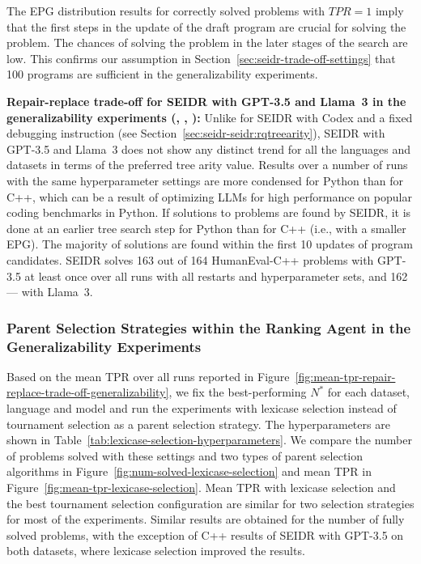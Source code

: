 The EPG distribution results for correctly solved problems with $TPR=1$ imply that the first steps in the update of the draft program are crucial for solving the problem. 
The chances of solving the problem in the later stages of the search are low.
This confirms our assumption in Section~\ref{sec:seidr-trade-off-settings} that 100 programs are sufficient in the generalizability experiments.

\begin{highlight}
\textbf{Repair-replace trade-off for SEIDR with GPT-3.5 and Llama~3 in the generalizability experiments (\rqtreearity{}, \rqllama{}, \rqmultirun{}):}
Unlike for SEIDR with Codex and a fixed debugging instruction (see Section~\ref{sec:seidr-seidr:rqtreearity}), SEIDR with GPT-3.5 and Llama~3 does not show any distinct trend for all the languages and datasets in terms of the preferred tree arity value. 
Results over a number of runs with the same hyperparameter settings are more condensed for Python than for C++, which can be a result of optimizing LLMs for high performance on popular coding benchmarks in Python.
If solutions to problems are found by SEIDR, it is done at an earlier tree search step for Python than for C++ (i.e., with a smaller EPG). 
The majority of solutions are found within the first 10 updates of program candidates. 
SEIDR solves 163 out of 164 HumanEval-C++ problems with GPT-3.5 at least once over all runs with all restarts and hyperparameter sets, and 162 --- with Llama~3.
\end{highlight}



\subsubsection{Parent Selection Strategies within the Ranking Agent in the Generalizability Experiments}
\label{sec:seidr-lexicase-results}

Based on the mean TPR over all runs reported in Figure~\ref{fig:mean-tpr-repair-replace-trade-off-generalizability}, we fix the best-performing $N^*$ for each dataset, language and model and run the experiments with lexicase selection instead of tournament selection as a parent selection strategy. 
The hyperparameters are shown in Table~\ref{tab:lexicase-selection-hyperparameters}.
We compare the number of problems solved with these settings and two types of parent selection algorithms in Figure~\ref{fig:num-solved-lexicase-selection} and mean TPR in Figure~\ref{fig:mean-tpr-lexicase-selection}.
Mean TPR with lexicase selection and the best tournament selection configuration are similar for two selection strategies for most of the experiments.
Similar results are obtained for the number of fully solved problems, with the exception of C++ results of SEIDR with GPT-3.5 on both datasets, where lexicase selection improved the results.

